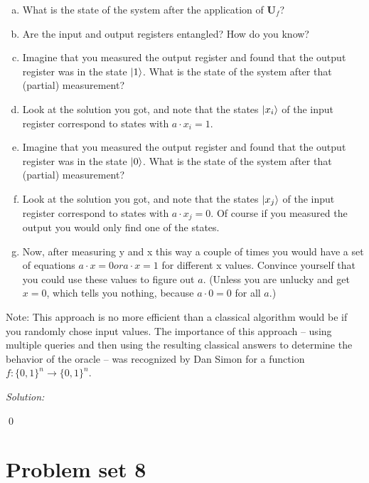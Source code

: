\documentclass{book}
\theoremstyle{definition}
\newcommand{\U}{\mathbf{U}}
\begin{document}
\begin{enumerate}[(a)]
	\item What is the state of the system after the application of $\U_f$?
	\item Are the input and output registers entangled? How do you know?

	\item Imagine that you measured the output register and found that the output register was
	in the state $\ket{1}$. What is the state of the system after that (partial) measurement?

	\item Look at the solution you got, and note that the states $\ket{x_i}$ of the input register correspond to states with $a \cdot x_i = 1$.
	\item  Imagine that you measured the output register and found that the output register was in the state $\ket{0}$. What is the state of the system after that (partial) measurement?
	\item  Look at the solution you got, and note that the states $\ket{x_j}$ of the input register correspond to states with $a · x_j = 0$. Of course if you measured the output you would only find one
	of the states.

	\item Now, after measuring y and x this way a couple of times you would have a set of equations
	$a \cdot x = 0 or a \cdot x = 1$ for different x values. Convince yourself that you could use these values to figure out $a$. (Unless you are unlucky and get $x = 0$, which tells you nothing,
	because $a \cdot 0 = 0$ for all $a$.)

\end{enumerate}

Note: This approach is no more efficient than a classical algorithm would be if you randomly
chose input values. The importance of this approach – using multiple queries and then using
the resulting classical answers to determine the behavior of the oracle – was recognized by
Dan Simon for a function $f : \{0, 1\}^n \to \{0, 1\}^n$.\\







\newpage


\noindent \textit{Solution:}







\qed


\newpage















\section{Problem set 8}


\newpage
\end{document}
